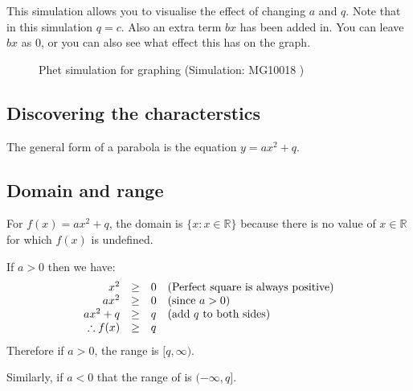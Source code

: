 This simulation allows you to visualise the effect of changing $a$ and $q$. Note that in this simulation $q = c$. Also an extra term $bx$ has been added in. You can leave $bx$ as $0$, or you can also see what effect this has on the graph.
\par 
\setcounter{subfigure}{0}
\begin{figure}[H] %
\textnormal{Phet simulation for graphing}\vspace{.1in} \nopagebreak
\label{m39345*phet!!!underscore!!!sim}\label{m39345*phet-simulation}
 { (Simulation:  MG10018 )}
\vspace{2pt}
\vspace{.1in}
\end{figure}       


\subsection*{Discovering the characterstics}
The general form of a parabola is the equation $y=ax^{2} + q$.
\subsection*{Domain and range}

For $f(x)=a{x}^{2}+q$, the domain is $\{x:x\in \mathbb{R}\}$ because there is no value of $x\in \mathbb{R}$ for which $f(x)$ is undefined.\par 
\par 
If $a>0$ then we have:
\begin{equation*}
\begin{array}{cccl}\hfill {x}^{2}& \ge & 0\hfill & (\mbox{Perfect square is always positive})\hfill \\
 \hfill a{x}^{2}& \ge & 0\hfill & (\mbox{since } a>0)\hfill \\
 \hfill a{x}^{2}+q& \ge & q\hfill & (\mbox{add $q$ to both sides}) \\
 \hfill \therefore f(x)& \ge & q\hfill & 
\end{array}
\end{equation*}
Therefore if $a>0$, the range is $[q,\infty )$.\par 
Similarly, if $a<0$ that the range of is $ (-\infty ,q]$. 

